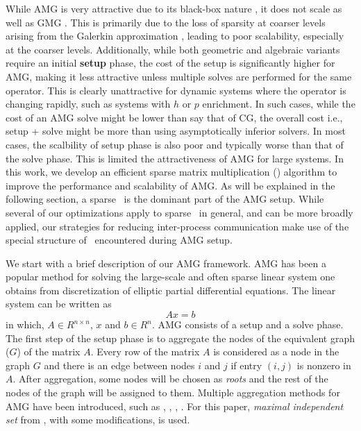 While AMG is very attractive due to its black-box nature \cite{Dendy82,Vanek:1995,VanekBrezinaMandelEtAl01}, it does not scale as well as GMG \cite{Sundar12}. This is primarily due to
the loss of sparsity at coarser levels arising from the Galerkin approximation \cite{treister2015non}, leading to poor scalability, especially at the coarser levels.
Additionally, while both geometric and algebraic variants require an initial {\bf setup} phase, the cost of the setup is significantly higher for AMG, making it less attractive unless multiple solves are performed for the same operator. This is clearly unattractive for dynamic systems where the operator is changing rapidly, such as systems with $h$ or $p$ enrichment. In such cases, while the cost of an AMG solve might be lower than say that of CG, the overall cost i.e., setup + solve might be more than using asymptotically inferior solvers. In most cases, the scalbility of 
setup phase is also poor and typically worse than that of the solve phase. This is limited the attractiveness of AMG for large systems. In this work, we develop an efficient sparse matrix multiplication (\mm) algorithm to improve the performance and scalability of AMG. As will be explained in the following section, a sparse \mm\ is the dominant part of the AMG setup. While several of our optimizations apply to sparse \mm\ in general, and can be more broadly applied, our strategies for reducing inter-process communication make use of the special structure of \mm\ encountered during AMG setup.


We start with a brief description of our AMG framework. 
AMG has been a popular method for solving the large-scale and 
often sparse linear system one obtains from discretization of elliptic partial 
differential equations.  The linear system can be written as
\begin{equation}
 Ax = b
\end{equation}
\noindent in which, $A \in R^{n \times n}$, $x$ and $b \in R^{n}$.
AMG consists of a setup and a solve phase.
The first step of the setup phase is to aggregate the nodes of the equivalent 
graph ($G$) of the matrix $A$. Every row of the matrix $A$ is considered as a node
in the graph $G$ and there is an edge between nodes $i$ and $j$ if entry $(i,j)$ is nonzero in $A$.
After aggregation, %
some nodes will be chosen as \textit{roots} and the
rest of the nodes of the graph will be assigned to them.
Multiple aggregation methods for AMG have been introduced, such as
\cite{bell2012exposing}, \cite{notay2010aggregation},
\cite{Guillard98anaggregation}, %
\cite{DBLP:journals/siammax/Notay06}. %
For this paper, \textit{maximal independent set} from \cite{bell2012exposing}, with some modifications, is used.

